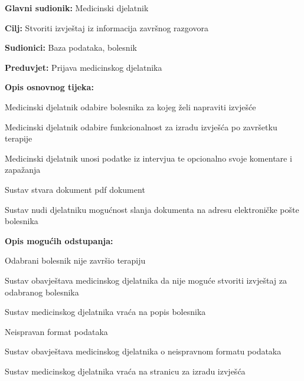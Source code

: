 	
		\noindent {}
		\begin{packed_item}
			
			\item \textbf{Glavni sudionik: }Medicinski djelatnik
			\item  \textbf{Cilj:} Stvoriti izvještaj iz informacija završnog razgovora
			\item  \textbf{Sudionici:} Baza podataka, bolesnik
			\item  \textbf{Preduvjet:} Prijava medicinskog djelatnika
			\item  \textbf{Opis osnovnog tijeka:}
			
			
			\item[] \begin{packed_enum}
				
				\item Medicinski djelatnik odabire bolesnika za kojeg želi napraviti izvješće
				\item Medicinski djelatnik odabire funkcionalnost za izradu izvješća po završetku terapije		
				\item Medicinski djelatnik unosi podatke iz intervjua te opcionalno svoje komentare i zapažanja
				\item Sustav stvara dokument pdf dokument
				\item Sustav nudi djelatniku mogućnost slanja dokumenta na adresu elektroničke pošte bolesnika
				
			\end{packed_enum}
			
			\item  \textbf{Opis mogućih odstupanja:}
			\item[2.a] Odabrani bolesnik nije završio terapiju
			\item[] \begin{packed_enum}
				
				\item Sustav obavještava medicinskog djelatnika da nije moguće stvoriti izvještaj za odabranog bolesnika
				\item Sustav medicinskog djelatnika vraća na popis bolesnika
				
						
			\end{packed_enum}
			\item[3.a] Neispravan format podataka
			\item[] \begin{packed_enum}
				
				\item Sustav obavještava medicinskog djelatnika o neispravnom formatu podataka
				\item Sustav medicinskog djelatnika vraća na stranicu za izradu izvješća
				

\end{packed_enum}
\end{packed_item}
